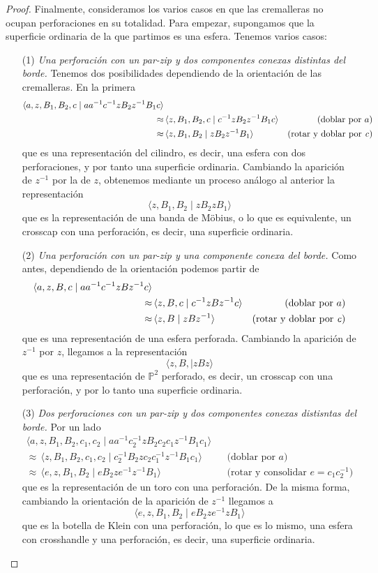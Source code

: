 \documentclass[10pt]{report}
\newcommand{\Proyectivo}{\mathbb{P}^2}
\theoremstyle{definition}
\begin{document}
\begin{proof}
Finalmente, consideramos los varios casos en que las cremalleras no ocupan perforaciones en su totalidad. Para empezar, supongamos que la superficie ordinaria de la que partimos es una esfera. Tenemos varios casos:
\begin{itemize}
\item[(1)] \textit{Una perforación con un par-zip y dos componentes conexas distintas del borde.} Tenemos dos posibilidades dependiendo de la orientación de las cremalleras. En la primera 
\begin{align*}
\langle a,z,B_1,B_2,c\mid aa^{-1} c^{-1}zB_2z^{-1}B_1c\rangle & & \\
\approx & \, \langle z,B_1,B_2,c\mid c^{-1}zB_2z^{-1}B_1c\rangle &\text{(doblar por } a\text{)}\\
\approx & \, \langle z,B_1,B_2\mid zB_2z^{-1}B_1\rangle &\text{(rotar y doblar por \textit{c})}
\end{align*}
que es una representación del cilindro, es decir, una esfera con dos perforaciones, y por tanto una superficie ordinaria. Cambiando la aparición de $z^{-1}$ por la de $z$, obtenemos mediante un proceso análogo al anterior la representación
\[ \langle z,B_1,B_2\mid zB_2zB_1 \rangle
\]
que es la representación de una banda de Möbius, o lo que es equivalente, un crosscap con una perforación, es decir, una superficie ordinaria.
\item[(2)] \textit{Una perforación con un par-zip y una componente conexa del borde.} Como antes, dependiendo de la orientación podemos partir de 
\begin{align*}
\langle a,z,B,c\mid aa^{-1} c^{-1}zBz^{-1}c\rangle & & \\
\approx & \, \langle z,B,c\mid c^{-1}zBz^{-1}c\rangle &\text{(doblar por } a\text{)}\\
\approx & \, \langle z,B\mid zBz^{-1}\rangle &\text{(rotar y doblar por \textit{c})}
\end{align*}
que es una representación de una esfera perforada. Cambiando la aparición de $z^{-1}$ por $z$, llegamos a la representación
\[
\langle z,B,\mid zBz\rangle
\]
que es una representación de $\Proyectivo$ perforado, es decir, un crosscap con una perforación, y por lo tanto una superficie ordinaria.
\item[(3)] \textit{Dos perforaciones con un par-zip y dos componentes conexas distisntas del borde.} Por un lado
\begin{align*}
\langle a,z,B_1,B_2,c_1,c_2\mid aa^{-1} c_2^{-1}zB_2c_2c_1z^{-1}B_1c_1\rangle & & \\
\approx  \, \langle z,B_1,B_2,c_1,c_2\mid c_2^{-1}B_2zc_2c_1^{-1}z^{-1}B_1c_1\rangle &&\text{(doblar por } a\text{)}\\
\approx  \, \langle e,z,B_1,B_2\mid eB_2ze^{-1}z^{-1}B_1\rangle &&\text{(rotar y consolidar } e=c_1c_2^{-1} \text{)}
\end{align*}
que es la representación de un toro con una perforación. De la misma forma, cambiando la orientación de la aparición de $z^{-1}$ llegamos a 
\[
\langle e,z,B_1,B_2\mid eB_2ze^{-1}zB_1\rangle
\]
que es la botella de Klein con una perforación, lo que es lo mismo, una esfera con crosshandle y una perforación, es decir, una superficie ordinaria.


\end{itemize}
\end{proof}
\end{document}

